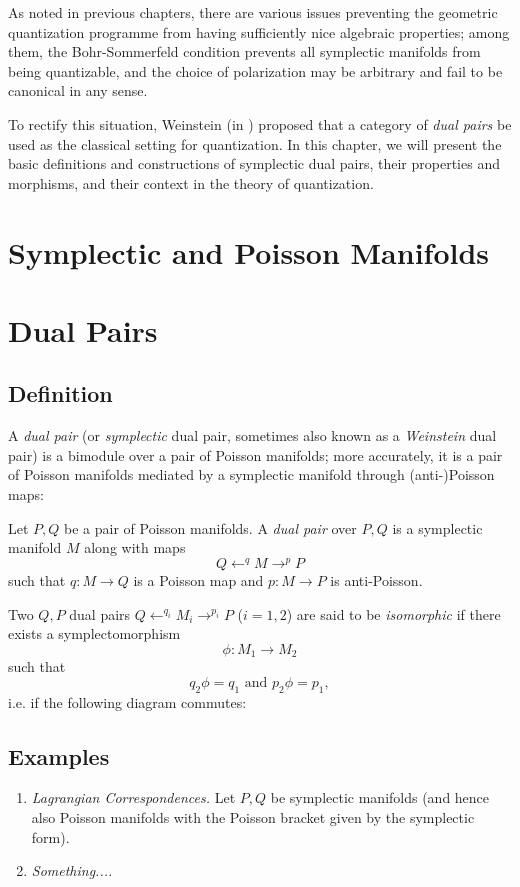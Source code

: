 As noted in previous chapters, there are various issues preventing the geometric quantization programme from having sufficiently nice algebraic properties; among them, the Bohr-Sommerfeld condition prevents all symplectic manifolds from being quantizable, and the choice of polarization may be arbitrary and fail to be canonical in any sense.

To rectify this situation, Weinstein (in \cite{weinsteindualpairs}) proposed that a category of \emph{dual pairs} be used as the classical setting for quantization. In this chapter, we will present the basic definitions and constructions of symplectic dual pairs, their properties and morphisms, and their context in the theory of quantization.

\section{Symplectic and Poisson Manifolds}


\section{Dual Pairs}

\subsection{Definition}
A \emph{dual pair} (or \emph{symplectic} dual pair, sometimes also known as a \emph{Weinstein} dual pair) is a bimodule over a pair of Poisson manifolds; more accurately, it is a pair of Poisson manifolds mediated by a symplectic manifold through (anti-)Poisson maps:

\begin{defn}
Let $P,Q$ be a pair of Poisson manifolds. A \emph{dual pair} over $P,Q$ is a symplectic manifold $M$ along with maps
$$
Q \leftarrow^q M \to^p P
$$
such that $q: M \to Q$ is a Poisson map and $p: M \to P$ is anti-Poisson.

Two $Q,P$ dual pairs $Q \leftarrow^{q_i} M_i \to^{p_i} P$ ($i = 1,2$) are said to be \emph{isomorphic} if there exists a symplectomorphism
$$
\phi: M_1 \to M_2
$$
such that
$$
q_2\phi = q_1 \mbox{ and } p_2\phi = p_1,
$$
i.e. if the following diagram commutes:
$$
$$
\end{defn}

\subsection{Examples}
\begin{enumerate}
\item \emph{Lagrangian Correspondences.} Let $P,Q$ be symplectic manifolds (and hence also Poisson manifolds with the Poisson bracket given by the symplectic form). %
\item \emph{Something....}
\end{enumerate}

